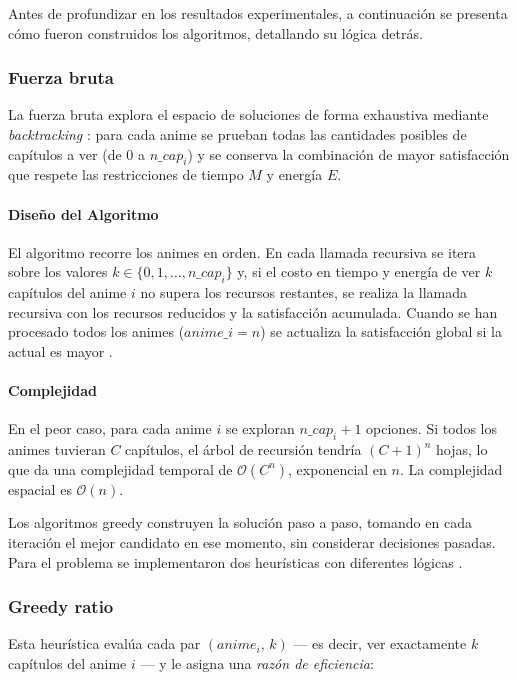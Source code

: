 Antes de profundizar en los resultados experimentales, a continuación se presenta cómo fueron construidos los algoritmos, detallando su lógica detrás.
\subsubsection*{Fuerza bruta}

La fuerza bruta explora el espacio de soluciones de forma exhaustiva mediante
\textit{backtracking} \parencite{roughgarden_algorithms}: para cada anime se prueban todas las cantidades posibles
de capítulos a ver (de $0$ a $n\_cap_i$) y se conserva la combinación de mayor
satisfacción que respete las restricciones de tiempo $M$ y energía $E$.

\paragraph{Diseño del Algoritmo}

El algoritmo recorre los animes en orden.  En cada llamada recursiva se itera
sobre los valores $k \in \{0, 1, \ldots, n\_cap_i\}$ y, si el costo en tiempo
y energía de ver $k$ capítulos del anime $i$ no supera los recursos restantes,
se realiza la llamada recursiva con los recursos reducidos y la satisfacción
acumulada.  Cuando se han procesado todos los animes ($anime\_i = n$) se
actualiza la satisfacción global si la actual es mayor \parencite{gfg_brute_force}.

\paragraph{Complejidad}

En el peor caso, para cada anime $i$ se exploran $n\_cap_i + 1$ opciones.
Si todos los animes tuvieran $C$ capítulos, el árbol de recursión tendría
$(C+1)^n$ hojas, lo que da una complejidad temporal de
$\mathcal{O}\!\left(C^n\right)$, exponencial en $n$.
La complejidad espacial es $\mathcal{O}(n)$.


\vspace{1cm}
Los algoritmos greedy construyen la solución paso a paso, tomando en cada iteración el mejor candidato en ese momento, sin considerar decisiones pasadas. Para el problema se implementaron dos heurísticas con diferentes lógicas \parencite{gfg_greedy_algorithms}.

\subsubsection*{Greedy ratio}
Esta heurística evalúa cada par $(anime_i,\, k)$ — es decir, ver exactamente
$k$ capítulos del anime $i$ — y le asigna una \emph{razón de eficiencia}:

